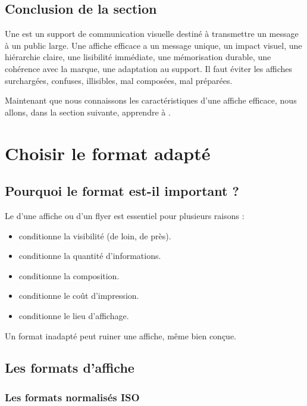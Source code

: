 \subsection*{Conclusion de la section}

Une  est un support de communication visuelle destiné à transmettre un message à un public large. Une affiche efficace a un message unique, un impact visuel, une hiérarchie claire, une lisibilité immédiate, une mémorisation durable, une cohérence avec la marque, une adaptation au support. Il faut éviter les affiches surchargées, confuses, illisibles, mal composées, mal préparées.

Maintenant que nous connaissons les caractéristiques d'une affiche efficace, nous allons, dans la section suivante, apprendre à .

\section{Choisir le format adapté}

\subsection{Pourquoi le format est-il important ?}

Le  d'une affiche ou d'un flyer est essentiel pour plusieurs raisons :

\begin{itemize}
    \item {} conditionne la visibilité (de loin, de près).
    \item {} conditionne la quantité d'informations.
    \item {} conditionne la composition.
    \item {} conditionne le coût d'impression.
    \item {} conditionne le lieu d'affichage.
\end{itemize}

Un format inadapté peut ruiner une affiche, même bien conçue.

\subsection{Les formats d'affiche}

\subsubsection{Les formats normalisés ISO}

